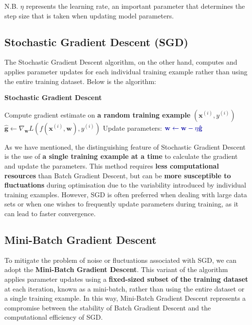 N.B. $\eta$ represents the learning rate, an important parameter that determines the step size that is taken when updating model parameters.

\subsection{Stochastic Gradient Descent (SGD)}

The Stochastic Gradient Descent algorithm, on the other hand, computes and applies parameter updates for each individual training example rather than using the entire training dataset. Below is the algorithm:

\begin{algorithm}
\renewcommand\thealgorithm{}
\caption{\textbf{\textcolor{mygreen}{Stochastic Gradient Descent}}}
\begin{algorithmic}[1]
    \STATE Compute gradient estimate on \textbf{\textcolor{myred}{a random training example}} $(\mathbf{x}^{(i)}, y^{(i)})$
    \STATE 
    $
    \mathbf{\hat{g}} \leftarrow\nabla_{\mathbf{w}} L(f(\mathbf{x}^{(i)},\mathbf{w}), y^{(i)})
    $
    \STATE Update parameters:
    $
    \textcolor{mybluee}{\mathbf{w} \leftarrow \mathbf{w} - \eta \mathbf{\hat{g}}}
    $
\ENDWHILE
\end{algorithmic}
\end{algorithm}

As we have mentioned, the distinguishing feature of Stochastic Gradient Descent is the use of \textbf{\textcolor{myred}{a single training example at a time}} to calculate the gradient and update the parameters. This method requires \textbf{less computational resources} than Batch Gradient Descent, but can be \textbf{more susceptible to fluctuations} during optimisation due to the variability introduced by individual training examples. However, SGD is often preferred when dealing with large data sets or when one wishes to frequently update parameters during training, as it can lead to faster convergence. 

\subsection{Mini-Batch Gradient Descent}
To mitigate the problem of noise or fluctuations associated with SGD, we can adopt the \textbf{\textcolor{mygreen}{Mini-Batch Gradient Descent}}. This variant of the algorithm applies parameter updates using a \textbf{\textcolor{myred}{fixed-sized subset of the training dataset}} at each iteration, known as a mini-batch, rather than using the entire dataset or a single training example. In this way, Mini-Batch Gradient Descent represents a compromise between the stability of Batch Gradient Descent and the computational efficiency of SGD.

